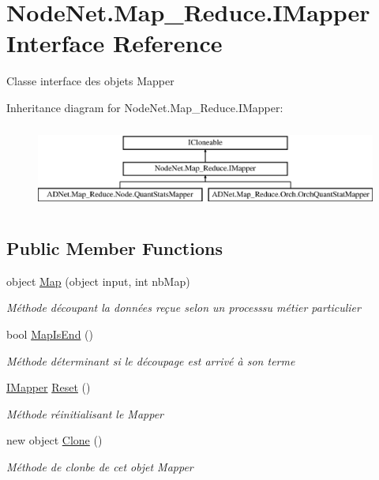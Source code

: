 \hypertarget{interface_node_net_1_1_map___reduce_1_1_i_mapper}{}\section{Node\+Net.\+Map\+\_\+\+Reduce.\+I\+Mapper Interface Reference}
\label{interface_node_net_1_1_map___reduce_1_1_i_mapper}


Classe interface des objets Mapper  


Inheritance diagram for Node\+Net.\+Map\+\_\+\+Reduce.\+I\+Mapper\+:\begin{figure}[H]
\begin{center}
\leavevmode
\includegraphics[height=2.790698cm]{interface_node_net_1_1_map___reduce_1_1_i_mapper}
\end{center}
\end{figure}
\subsection*{Public Member Functions}
\begin{DoxyCompactItemize}
\item 
object \hyperlink{interface_node_net_1_1_map___reduce_1_1_i_mapper_ac25758a2753bdfdc9579d29b9a31fe73}{Map} (object input, int nb\+Map)
\begin{DoxyCompactList}\small\item\em Méthode découpant la données reçue selon un processsu métier particulier \end{DoxyCompactList}\item 
bool \hyperlink{interface_node_net_1_1_map___reduce_1_1_i_mapper_a0d6d2bd1a8081efa0d6df109af9c4ec1}{Map\+Is\+End} ()
\begin{DoxyCompactList}\small\item\em Méthode déterminant si le découpage est arrivé à son terme \end{DoxyCompactList}\item 
\hyperlink{interface_node_net_1_1_map___reduce_1_1_i_mapper}{I\+Mapper} \hyperlink{interface_node_net_1_1_map___reduce_1_1_i_mapper_a5cf335d5f21ae6bc32c774b947119134}{Reset} ()
\begin{DoxyCompactList}\small\item\em Méthode réinitialisant le Mapper \end{DoxyCompactList}\item 
new object \hyperlink{interface_node_net_1_1_map___reduce_1_1_i_mapper_a8d322c9ffa12be02d65da6c8b8563c77}{Clone} ()
\begin{DoxyCompactList}\small\item\em Méthode de clonbe de cet objet Mapper \end{DoxyCompactList}\end{DoxyCompactItemize}


